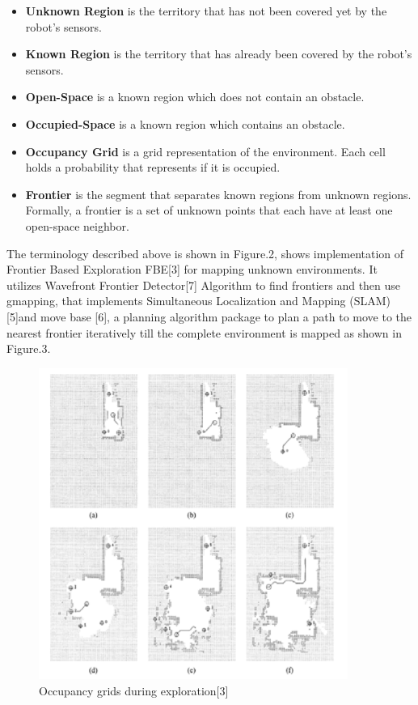 \begin{itemize}
    \item \textbf{Unknown Region} is the territory that has not been covered yet by the robot’s sensors.
    \item \textbf{Known Region} is the territory that has already been covered by the robot’s sensors.
    \item \textbf{Open-Space} is a known region which does not contain an obstacle.
    \item \textbf{Occupied-Space} is a known region which contains an obstacle.
    \item \textbf{Occupancy Grid} is a grid representation of the environment. Each cell holds a probability that represents if it is occupied.
    \item \textbf{Frontier} is the segment that separates known regions from unknown regions. Formally, a frontier is a set of unknown points that each have at least one open-space neighbor.
\end{itemize}
The terminology described above is shown in Figure.2, shows implementation of Frontier Based Exploration FBE[3] for mapping unknown environments. It utilizes  Wavefront Frontier Detector[7] Algorithm to find frontiers and then use gmapping, that implements Simultaneous Localization and
Mapping (SLAM) [5]and move base [6], a planning algorithm package to plan a path to move to the nearest frontier iteratively till the complete environment is mapped as shown in Figure.3.

\begin{figure}[h]
  \centering
  \includegraphics[width=0.9\textwidth, height=0.5\textheight]{Bilder/frontier_grids.png}
  \caption{Occupancy grids during exploration[3]}
  \label{fig:FBE2}
\end{figure}

